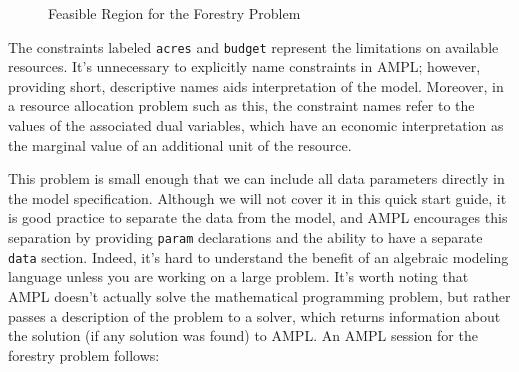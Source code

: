 \begin{figure}
\end{figure}

\begin{figure}
\begin{center}
\end{center}
\caption{Feasible Region for the Forestry Problem}
\label{feasibleregion}
\end{figure}

The constraints labeled \texttt{acres} and \texttt{budget} represent
the limitations on available resources.  It's unnecessary to
explicitly name constraints in AMPL; however, providing short,
descriptive names aids interpretation of the model. Moreover, in a
resource allocation problem such as this, the constraint names refer
to the values of the associated dual variables, which have an economic
interpretation as the marginal value of an additional unit of the
resource.

This problem is small enough that we can include all data parameters
directly in the model specification. Although we will not cover it in
this quick start guide, it is good practice to separate the data from
the model, and AMPL encourages this separation by providing
\texttt{param} declarations and the ability to have a separate
\texttt{data} section. Indeed, it's hard to understand the benefit of
an algebraic modeling language unless you are working on a large
problem.  It's worth noting that AMPL doesn't actually solve the
mathematical programming problem, but rather passes a description of
the problem to a solver, which returns information about the solution
(if any solution was found) to AMPL. An AMPL session for the forestry
problem follows:

